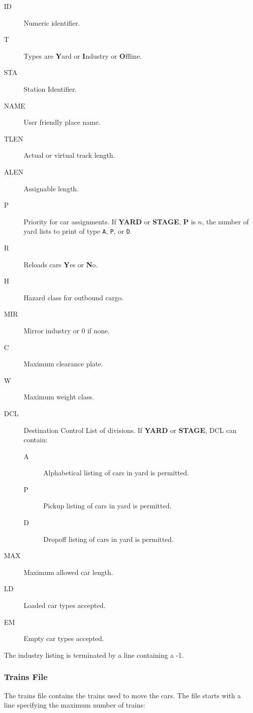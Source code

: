 \begin{description}
\item[ID]    Numeric identifier.
\item[T]     Types are \textbf{Y}ard or \textbf{I}ndustry or \textbf{O}ffline.
\item[STA]   Station Identifier.
\item[NAME]  User friendly place name.
\item[TLEN]  Actual or virtual track length.
\item[ALEN]  Assignable length.
\item[P]     Priority for car assignments. If \textbf{YARD} or \textbf{STAGE}, 
	\textbf{P} is $n$, the number of yard lists to print of type \verb=A=, 
	\verb=P=, or \verb=D=.
\item[R]     Reloads cars \textbf{Y}es or \textbf{N}o.
\item[H]     Hazard class for outbound cargo.
\item[MIR]   Mirror industry or 0 if none.
\item[C]     Maximum clearance plate.
\item[W]     Maximum weight class.
\item[DCL]   Destination Control List of divisions. If \textbf{YARD} or 
\textbf{STAGE}, DCL can contain:
  \begin{description}
  \item[A]     Alphabetical listing of cars in yard is permitted.
  \item[P]     Pickup listing of cars in yard is permitted.
  \item[D]     Dropoff listing of cars in yard is permitted.
  \end{description}
\item[MAX]   Maximum allowed car length.
\item[LD]    Loaded car types accepted.
\item[EM]    Empty car types accepted.
\end{description}

The industry listing is terminated by a line containing a -1.

\subsubsection{Trains File}

The trains file contains the trains used to move the cars.  The file
starts with a line specifying the maximum number of trains:


